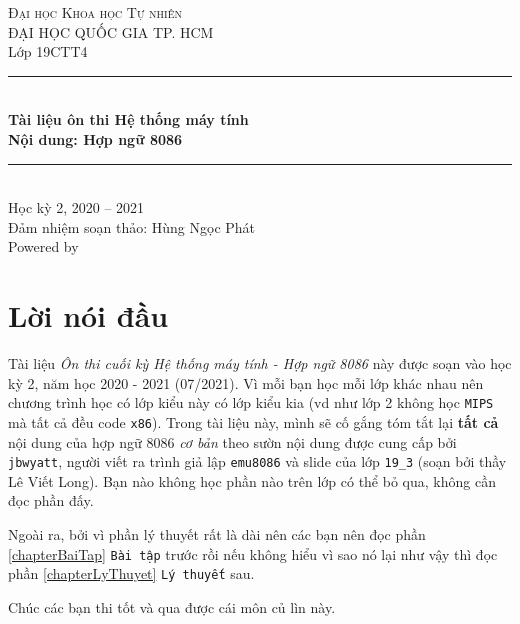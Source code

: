 \documentclass[12pt]{report}
\newcommand{\cd}[1]{\texttt{#1}}
\begin{document}
\begin{titlepage}
    \vspace*{\fill}

    \centering
    \textsc{\LARGE Đại học Khoa học Tự nhiên}\\[0.5cm]
    \textsc{\large ĐẠI HỌC QUỐC GIA TP. HCM}\\[0.5cm]
    
    {\Large Lớp 19CTT4}\\[1.5cm]

    \rule{\textwidth}{0.4pt} \\[0.4cm]
    {
        \huge \bfseries Tài liệu ôn thi Hệ thống máy tính\\
        Nội dung: Hợp ngữ 8086
    }
    \rule{\textwidth}{0.4pt}\\[1.5cm]
    
    {\Large Học kỳ 2, 2020 -- 2021}\\[1.5cm]
    {\large Đảm nhiệm soạn thảo: Hùng Ngọc Phát \\
    Powered by \LaTeXe}
    \vspace*{\fill}

\end{titlepage}


\section*{Lời nói đầu}
Tài liệu \textit{Ôn thi cuối kỳ Hệ thống máy tính - Hợp ngữ 8086} này được soạn vào học kỳ 2, năm học 2020 - 2021 (07/2021). Vì mỗi bạn học mỗi lớp khác nhau nên chương trình học có lớp kiểu này có lớp kiểu kia (vd như lớp 2 không học \cd{MIPS} mà tất cả đều code \cd{x86}). Trong tài liệu này, mình sẽ cố gắng tóm tắt lại \textbf{tất cả} nội dung của hợp ngữ 8086 \textit{cơ bản} theo sườn nội dung được cung cấp bởi \cd{jbwyatt}, người viết ra trình giả lập \cd{emu8086} và slide của lớp \cd{19\_3} (soạn bởi thầy Lê Viết Long). Bạn nào không học phần nào trên lớp có thể bỏ qua, không cần đọc phần đấy.\bigskip

Ngoài ra, bởi vì phần lý thuyết rất là dài nên các bạn nên đọc phần \ref{chapterBaiTap} \cd{Bài tập} trước rồi nếu không hiểu vì sao nó lại như vậy thì đọc phần \ref{chapterLyThuyet} \cd{Lý thuyết} sau. \bigskip

Chúc các bạn thi tốt và qua được cái môn {\tiny củ lìn} này.\\
\vspace*{\fill}
\end{document}
